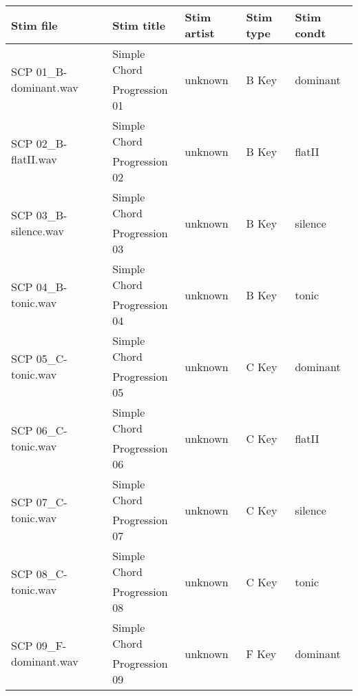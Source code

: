 \documentclass[preprint,12pt, a4paper]{elsarticle}
\begin{document}
\begin{table}[h]
    \centering
    \small
    \begin{tabular}{|l|l|l|l|l|}
    \hline
       \textbf{Stim file}  & \textbf{Stim title} & \textbf{Stim artist} & \textbf{Stim type} & \textbf{Stim condt} \\
       \hline
        \multirow{2}{*}{SCP 01\_B-dominant.wav} & Simple Chord & \multirow{2}{*}{unknown} & \multirow{2}{*}{B Key} & \multirow{2}{*}{dominant} \\ & Progression 01 & & & \\
        \hline
        \multirow{2}{*}{SCP 02\_B-flatII.wav} & Simple Chord & \multirow{2}{*}{unknown} & 
        \multirow{2}{*}{B Key} & \multirow{2}{*}{flatII} \\ & Progression 02 & & & \\
        \hline
        \multirow{2}{*}{SCP 03\_B-silence.wav} & Simple Chord & \multirow{2}{*}{unknown} & \multirow{2}{*}{B Key} & \multirow{2}{*}{silence} \\ & Progression 03 & & & \\
        \hline
        \multirow{2}{*}{SCP 04\_B-tonic.wav} & Simple Chord & \multirow{2}{*}{unknown} & 
        \multirow{2}{*}{B Key} & \multirow{2}{*}{tonic} \\ & Progression 04 & & & \\
        \hline
        \multirow{2}{*}{SCP 05\_C-tonic.wav} & Simple Chord & \multirow{2}{*}{unknown} & 
        \multirow{2}{*}{C Key} & \multirow{2}{*}{dominant} \\ & Progression 05 & & & \\
        \hline
        \multirow{2}{*}{SCP 06\_C-tonic.wav} & Simple Chord & \multirow{2}{*}{unknown} & 
        \multirow{2}{*}{C Key} & \multirow{2}{*}{flatII} \\ & Progression 06 & & & \\
        \hline
        \multirow{2}{*}{SCP 07\_C-tonic.wav} & Simple Chord & \multirow{2}{*}{unknown} & 
        \multirow{2}{*}{C Key} & \multirow{2}{*}{silence} \\ & Progression 07 & & & \\
        \hline
        \multirow{2}{*}{SCP 08\_C-tonic.wav} & Simple Chord & \multirow{2}{*}{unknown} & 
        \multirow{2}{*}{C Key} & \multirow{2}{*}{tonic} \\ & Progression 08 & & & \\
        \hline
        \multirow{2}{*}{SCP 09\_F-dominant.wav} & Simple Chord & \multirow{2}{*}{unknown} & \multirow{2}{*}{F Key} & \multirow{2}{*}{dominant} \\ & Progression 09 & & & \\

\end{tabular}
\end{table}
\end{document}
